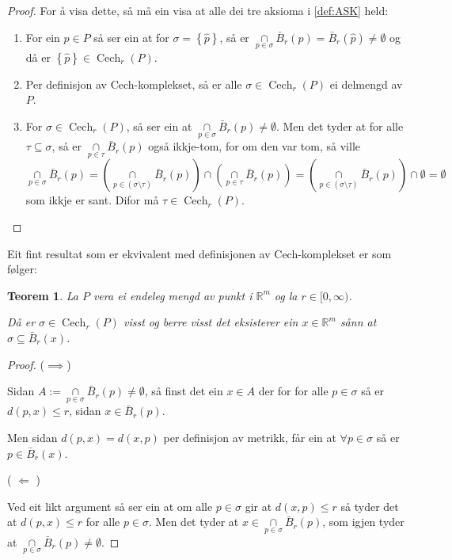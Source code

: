 \documentclass[a4paper, 12pt, norsk]{article}
\theoremstyle{plain}
\newtheorem{theorem}{Teorem}[section]
\theoremstyle{definition}
\newcommand{\Rb}{\mathbb{R}}
\newcommand{\intersect}{ \mathop{\cap}\limits }
\newcommand{\set}[1]{ \left\{ #1 \right\} } %
\DeclareMathOperator{\Cech}{Cech} %
\begin{document}
\begin{proof}
	For å visa dette, så må ein visa at alle dei tre aksioma i \autoref{def:ASK} held:
	\begin{enumerate}
		\item{ For ein \( \hat{p} \in P \) så ser ein at for \( \sigma = \set{\hat{p}} \), så er \( \intersect_{p\in\sigma}\bar{B}_r(p)=\bar{B}_r(\hat{p})\neq\emptyset \) og då er \( \set{\hat{p}} \in \Cech_r(P) \). }
		\item{ Per definisjon av Cech-komplekset, så er alle \( \sigma \in \Cech_r(P) \) ei delmengd av \( P \). }
		\item{ For \( \sigma \in \Cech_r(P) \), så ser ein at \( \intersect_{p\in\sigma} \bar{B}_r(p) \neq \emptyset \). Men det tyder at for alle \( \tau \subseteq \sigma \), så er \( \intersect_{p\in\tau} \bar{B}_r(p) \) også ikkje-tom, for om den var tom, så ville
			\[ 
				\intersect_{p\in\sigma} \bar{B}_r(p) = \left( \intersect_{p\in(\sigma\setminus\tau)} \bar{B}_r(p) \right) \intersect \left( \intersect_{p\in\tau} \bar{B}_r(p) \right) = \left( \intersect_{p\in(\sigma\setminus\tau)} \bar{B}_r(p) \right) \intersect \emptyset = \emptyset 
			\] 
			som ikkje er sant. Difor må \( \tau \in \Cech_r(P) \). }
	\end{enumerate}
\end{proof}

Eit fint resultat som er ekvivalent med definisjonen av Cech-komplekset er som følger:

\begin{theorem}
	La $P$ vera ei endeleg mengd av punkt i $\Rb^m$ og la $r\in[0, \infty)$.

	Då er \( \sigma \in \Cech_r(P) \) visst og berre visst det eksisterer ein \( x \in \Rb^m \) sånn at \( \sigma \subseteq \bar{B}_r(x) \).
\end{theorem}

\begin{proof}
	($\implies$)
	
	Sidan $A:=\intersect_{p\in\sigma}\bar{B}_r(p)\neq\emptyset$, så finst det ein $x\in A$ der for for alle \( p\in\sigma \) så er \( d(p,x)\leq r \), sidan $x\in\bar{B}_r(p)$.
	
	Men sidan $d(p,x)=d(x,p)$ per definisjon av metrikk, får ein at \( \forall p\in\sigma \) så er \( p \in \bar{B}_r(x) \).
	
	( \( \Longleftarrow \) )
	
	Ved eit likt argument så ser ein at om alle \( p \in \sigma \) gir at \( d(x, p) \leq r \) så tyder det at \( d(p, x) \leq r \) for alle \( p \in \sigma \). Men det tyder at \( x \in \intersect_{p \in \sigma} \bar{B}_r(p) \), som igjen tyder at \( \intersect_{p \in \sigma} \bar{B}_r(p) \neq \emptyset \).
\end{proof}
\end{document}
